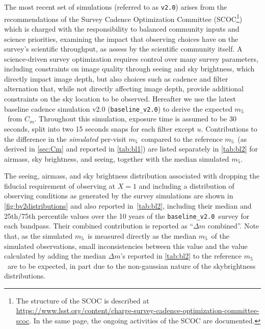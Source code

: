 \documentclass[PST,authoryear,toc]{lsstdoc}
\newcommand{\cm}{\ensuremath{C_m}}
\newcommand{\mf}{\ensuremath{m_5}}
\newcommand{\baseline}{\texttt{baseline\_v2.0}}
\begin{document}
 The most recent set of simulations (referred to as \texttt{v2.0}) arises from the recommendations of the Survey Cadence Optimization Committee (SCOC\footnote{The structure of the SCOC is described at \href{https://www.lsst.org/content/charge-survey-cadence-optimization-committee-scoc}{https://www.lsst.org/content/charge-survey-cadence-optimization-committee-scoc}. In the same page, the ongoing activities of the SCOC are documented.}) {which is charged with the responsibility to balanced community inputs and science priorities, examining the impact that observing choices have on the survey's scientific throughput, as assess by the scientific community itself. A science-driven survey optimization requires control over many survey parameters, including constraints on image quality through seeing and sky brightness, which directly impact image depth, but also choices such as cadence and filter alternation that, while not directly affecting image depth, provide additional constraints on the sky location to be observed}. Hereafter we use the latest baseline cadence simulation v2.0 
(\baseline) to derive the expected \mf\ from \cm. Throughout this simulation, %
exposure time is assumed to be 30 seconds, split into two 15 seconds snaps for each filter except $u$. Contributions to the difference in the {\it simulated} per-visit \mf\ compared to the reference \mf\ (as derived in \autoref{sec:Cm} and reported in \autoref{tab:bl1}) are listed separately in \autoref{tab:bl2} for airmass, sky brightness, and seeing, together with the median simulated \mf.
 
 The seeing, airmass, and sky brightness distribution associated with dropping the fiducial requirement of observing at $X=1$ and including a distribution of observing conditions as generated by the survey simulations are shown in \autoref{fig:bv2distributions} and also reported in~\autoref{tab:bl2}, including their median and 25th/75th percentile values over the 10 years of the \baseline\ survey for each bandpass. Their combined contribution is reported as ``$\Delta m$ combined''. Note that, as the simulated \mf\ is measured directly as the median \mf\ of the simulated observations, small inconsistencies between this value and the value calculated by adding the median $\Delta m$'s reported in \autoref{tab:bl2} to the reference \mf\ are to be expected, in part due to the non-gaussian nature of the skybrightness distributions.
 
\end{document}

